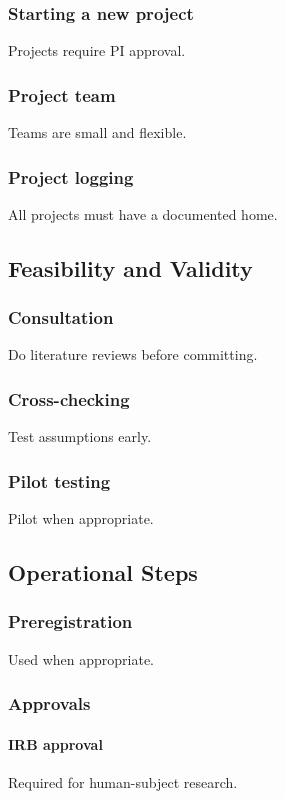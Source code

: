 \documentclass[11pt]{article}
\begin{document}
\subsubsection{Starting a new project}
Projects require PI approval.

\subsubsection{Project team}
Teams are small and flexible.

\subsubsection{Project logging}
All projects must have a documented home.

\subsection{Feasibility and Validity}

\subsubsection{Consultation}
Do literature reviews before committing.

\subsubsection{Cross-checking}
Test assumptions early.

\subsubsection{Pilot testing}
Pilot when appropriate.

\subsection{Operational Steps}

\subsubsection{Preregistration}
Used when appropriate.

\subsubsection{Approvals}

\paragraph{IRB approval}
Required for human-subject research.
\end{document}
